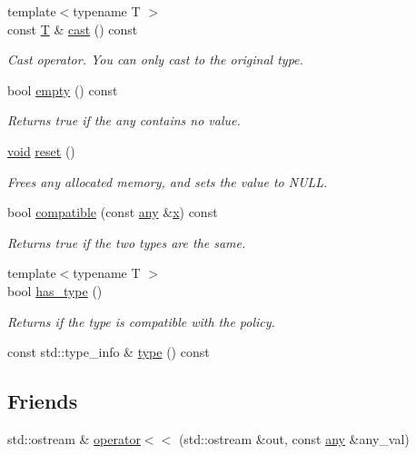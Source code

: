 \begin{DoxyCompactItemize}
{\footnotesize template$<$typename T $>$ }\\const \hyperlink{calib3d_8hpp_a3efb9551a871ddd0463079a808916717}{T} \& \hyperlink{structcvflann_1_1any_a8a30d3102c07ef58a2e8b3a49864d418}{cast} () const 
\begin{DoxyCompactList}\small\item\em Cast operator. You can only cast to the original type. \end{DoxyCompactList}\item 
bool \hyperlink{structcvflann_1_1any_a2f9c16a22aca2a6e6053d5bfedac9901}{empty} () const 
\begin{DoxyCompactList}\small\item\em Returns true if the any contains no value. \end{DoxyCompactList}\item 
\hyperlink{legacy_8hpp_a8bb47f092d473522721002c86c13b94e}{void} \hyperlink{structcvflann_1_1any_a56cb2ce55b54eaa62cdc88cbd441ef86}{reset} ()
\begin{DoxyCompactList}\small\item\em Frees any allocated memory, and sets the value to N\-U\-L\-L. \end{DoxyCompactList}\item 
bool \hyperlink{structcvflann_1_1any_a755b50cc51c7c37162d7b39d1010f117}{compatible} (const \hyperlink{structcvflann_1_1any}{any} \&\hyperlink{highgui__c_8h_a6150e0515f7202e2fb518f7206ed97dc}{x}) const 
\begin{DoxyCompactList}\small\item\em Returns true if the two types are the same. \end{DoxyCompactList}\item 
{\footnotesize template$<$typename T $>$ }\\bool \hyperlink{structcvflann_1_1any_a4ef5cda72c6a25e1f0ddd926966e639c}{has\-\_\-type} ()
\begin{DoxyCompactList}\small\item\em Returns if the type is compatible with the policy. \end{DoxyCompactList}\item 
const std\-::type\-\_\-info \& \hyperlink{structcvflann_1_1any_af841fa57af8b0ad38106f833d31a84dc}{type} () const 
\end{DoxyCompactItemize}
\subsection*{Friends}
\begin{DoxyCompactItemize}
\item 
std\-::ostream \& \hyperlink{structcvflann_1_1any_a2987b17b8a128cbefb105ed12f5b8f92}{operator$<$$<$} (std\-::ostream \&out, const \hyperlink{structcvflann_1_1any}{any} \&any\-\_\-val)
\end{DoxyCompactItemize}


